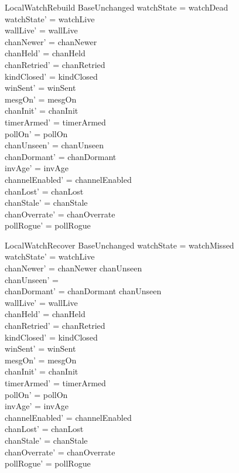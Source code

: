 \documentclass[a4paper,10pt,fleqn]{article}
\begin{document}
\begin{schema}{LocalWatchRebuild}
  BaseUnchanged
  \where
  watchState = watchDead \\
  watchState' = watchLive \\
  wallLive' = wallLive \\
  chanNewer' = chanNewer \\
  chanHeld' = chanHeld \\
  chanRetried' = chanRetried \\
  kindClosed' = kindClosed \\
  winSent' = winSent \\
  mesgOn' = mesgOn \\
  chanInit' = chanInit \\
  timerArmed' = timerArmed \\
  pollOn' = pollOn \\
  chanUnseen' = chanUnseen \\
  chanDormant' = chanDormant \\
  invAge' = invAge \\
  channelEnabled' = channelEnabled \\
  chanLost' = chanLost \\
  chanStale' = chanStale \\
  chanOverrate' = chanOverrate \\
  pollRogue' = pollRogue
\end{schema}

\begin{schema}{LocalWatchRecover}
  BaseUnchanged
  \where
  watchState = watchMissed \\
  watchState' = watchLive \\
  chanNewer' = chanNewer \cup chanUnseen \\
  chanUnseen' = \emptyset \\
  chanDormant' = chanDormant \setminus chanUnseen \\
  wallLive' = wallLive \\
  chanHeld' = chanHeld \\
  chanRetried' = chanRetried \\
  kindClosed' = kindClosed \\
  winSent' = winSent \\
  mesgOn' = mesgOn \\
  chanInit' = chanInit \\
  timerArmed' = timerArmed \\
  pollOn' = pollOn \\
  invAge' = invAge \\
  channelEnabled' = channelEnabled \\
  chanLost' = chanLost \\
  chanStale' = chanStale \\
  chanOverrate' = chanOverrate \\
  pollRogue' = pollRogue
\end{schema}
\end{document}
